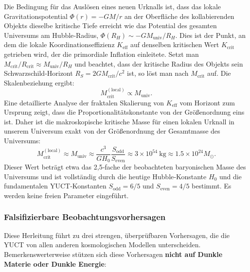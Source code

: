 \documentclass[11pt,a4paper]{article}
\begin{document}
	Die Bedingung für das Auslösen eines neuen Urknalls ist, dass das lokale Gravitationspotential \(\Phi(r) = -GM/r\) an der Oberfläche des kollabierenden Objekts dieselbe kritische Tiefe erreicht wie das Potential des gesamten Universums am Hubble‑Radius, \(\Phi(R_H) \sim -G M_{\mathrm{univ}}/R_H\). Dies ist der Punkt, an dem die lokale Koordinationseffizienz \(K_{\mathrm{eff}}\) auf denselben kritischen Wert \(K_{\mathrm{crit}}\) getrieben wird, der die primordiale Inflation einleitete. Setzt man \(M_{\mathrm{crit}}/R_{\mathrm{crit}} \approx M_{\mathrm{univ}}/R_H\) und beachtet, dass der kritische Radius des Objekts sein Schwarzschild‑Horizont \(R_S = 2GM_{\mathrm{crit}}/c^2\) ist, so löst man nach \(M_{\mathrm{crit}}\) auf. Die Skalenbeziehung ergibt:
	\begin{equation}
		M_{\mathrm{crit}}^{\mathrm{(local)}} \propto M_{\mathrm{univ}}.
	\end{equation}
	Eine detaillierte Analyse der fraktalen Skalierung von \(K_{\mathrm{eff}}\) vom Horizont zum Ursprung \cite{AppendixL} zeigt, dass die Proportionalitätskonstante von der Größenordnung eins ist. Daher ist die makroskopische kritische Masse für einen lokalen Urknall in unserem Universum exakt von der Größenordnung der Gesamtmasse des Universums:
	\begin{equation}
		\boxed{ M_{\mathrm{crit}}^{\mathrm{(local)}} \approx M_{\mathrm{univ}} \approx \frac{c^3}{G H_0} \frac{S_{\mathrm{odd}}}{S_{\mathrm{even}}} \approx 3 \times 10^{54}\ \mathrm{kg} \approx 1.5 \times 10^{24} M_{\odot} }.
		\label{eq:Mcrit-macro}
	\end{equation}
	Dieser Wert beträgt etwa das 2,5‑fache der beobachteten baryonischen Masse des Universums und ist vollständig durch die heutige Hubble‑Konstante \(H_0\) und die fundamentalen YUCT‑Konstanten \(S_{\mathrm{odd}}=6/5\) und \(S_{\mathrm{even}}=4/5\) bestimmt. Es werden keine freien Parameter eingeführt.
	
	\subsubsection{Falsifizierbare Beobachtungsvorhersagen}
	
	Diese Herleitung führt zu drei strengen, überprüfbaren Vorhersagen, die die YUCT von allen anderen kosmologischen Modellen unterscheiden. Bemerkenswerterweise stützen sich diese Vorhersagen \textbf{nicht auf Dunkle Materie oder Dunkle Energie}:
	
\end{document}
